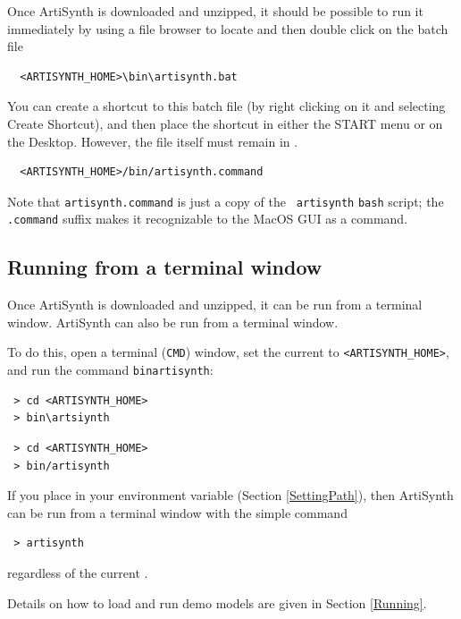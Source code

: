 Once ArtiSynth is downloaded and unzipped, it should be possible to
run it immediately by using a file browser to locate and then
double click on the batch file
\ifWindows
\begin{verbatim}
  <ARTISYNTH_HOME>\bin\artisynth.bat
\end{verbatim}

You can create a shortcut to this batch file (by right clicking on it
and selecting {\sf Create Shortcut}), and then place the shortcut in
either the {\sf START} menu or on the Desktop. However, the file
itself must remain in .
\fi
\ifMacOS
\begin{verbatim}
  <ARTISYNTH_HOME>/bin/artisynth.command
\end{verbatim}
Note that {\tt artisynth.command} is just a copy of the {\tt
artisynth} {\tt bash} script; the {\tt .command} suffix makes it
recognizable to the MacOS GUI as a command.
\fi
\fi %

\subsection{Running from a terminal window}
\label{artisynthCommandLine}

\ifLinux
Once ArtiSynth is downloaded and unzipped, it can be
run from a terminal window.
\else %
ArtiSynth can also be run from a terminal window.
\fi %

To do this, open a terminal 
\ifWindows
({\tt CMD})
\fi
window, set the current \directory{} to {\tt <ARTISYNTH\_HOME>}, and
run the command {\tt bin\SEP artisynth}:
\ifWindows
\begin{verbatim}
 > cd <ARTISYNTH_HOME>
 > bin\artsiynth
\end{verbatim}
\else
\begin{verbatim}
 > cd <ARTISYNTH_HOME>
 > bin/artisynth
\end{verbatim}
\fi

\begin{sideblock}
If you place  in your \PATH{} environment
variable (Section \ref{SettingPath}), then ArtiSynth can be
run from a terminal window with the simple command
\begin{verbatim}
 > artisynth
\end{verbatim}
regardless of the current \directory{}.
\end{sideblock}

Details on how to load and run demo models are given in
Section \ref{Running}.

